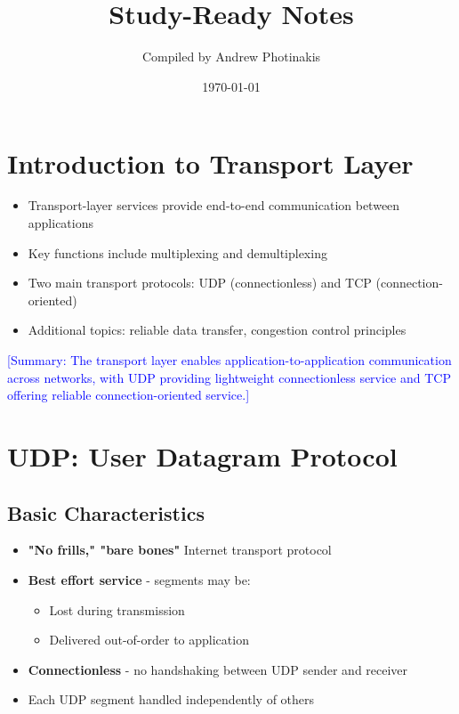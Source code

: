 \documentclass[12pt]{article}
\title{\TOPICTITLE\\\large Study-Ready Notes}
\author{Compiled by Andrew Photinakis}
\date{\today}
\begin{document}
\maketitle
\tableofcontents
\newpage

\section{Introduction to Transport Layer}
\begin{itemize}
    \item Transport-layer services provide end-to-end communication between applications
    \item Key functions include multiplexing and demultiplexing
    \item Two main transport protocols: UDP (connectionless) and TCP (connection-oriented)
    \item Additional topics: reliable data transfer, congestion control principles
\end{itemize}

\textcolor{blue}{[Summary: The transport layer enables application-to-application communication across networks, with UDP providing lightweight connectionless service and TCP offering reliable connection-oriented service.]}

\section{UDP: User Datagram Protocol}

\subsection{Basic Characteristics}
\begin{itemize}
    \item \textbf{"No frills," "bare bones"} Internet transport protocol
    \item \textbf{Best effort service} - segments may be:
          \begin{itemize}
              \item Lost during transmission
              \item Delivered out-of-order to application
          \end{itemize}
    \item \textbf{Connectionless} - no handshaking between UDP sender and receiver
    \item Each UDP segment handled independently of others
\end{itemize}
\end{document}
